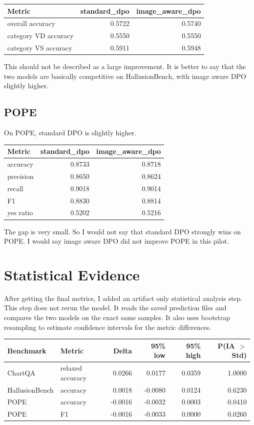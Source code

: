 \documentclass{article}
\begin{document}
\begin{center}
\begin{tabular}{lrr}
\toprule
Metric & standard\_dpo & image\_aware\_dpo \\
\midrule
overall accuracy & 0.5722 & 0.5740 \\
category VD accuracy & 0.5550 & 0.5550 \\
category VS accuracy & 0.5911 & 0.5948 \\
\bottomrule
\end{tabular}
\end{center}

This should not be described as a large improvement.
It is better to say that the two models are basically competitive on HallusionBench, with image aware DPO slightly higher.

\subsection{POPE}
On POPE, standard DPO is slightly higher.

\begin{center}
\begin{tabular}{lrr}
\toprule
Metric & standard\_dpo & image\_aware\_dpo \\
\midrule
accuracy & 0.8733 & 0.8718 \\
precision & 0.8650 & 0.8624 \\
recall & 0.9018 & 0.9014 \\
F1 & 0.8830 & 0.8814 \\
yes ratio & 0.5202 & 0.5216 \\
\bottomrule
\end{tabular}
\end{center}

The gap is very small.
So I would not say that standard DPO strongly wins on POPE.
I would say image aware DPO did not improve POPE in this pilot.

\section{Statistical Evidence}
After getting the final metrics, I added an artifact only statistical analysis step.
This step does not rerun the model.
It reads the saved prediction files and compares the two models on the exact same samples.
It also uses bootstrap resampling to estimate confidence intervals for the metric differences.

\begin{center}
\small
\begin{tabular}{@{}llrrrr@{}}
\toprule
Benchmark & Metric & Delta & 95\% low & 95\% high & P(IA $>$ Std) \\
\midrule
ChartQA & relaxed accuracy & 0.0266 & 0.0177 & 0.0359 & 1.0000 \\
HallusionBench & accuracy & 0.0018 & -0.0080 & 0.0124 & 0.6230 \\
POPE & accuracy & -0.0016 & -0.0032 & 0.0003 & 0.0410 \\
POPE & F1 & -0.0016 & -0.0033 & 0.0000 & 0.0260 \\
\bottomrule
\end{tabular}
\end{center}
\end{document}
